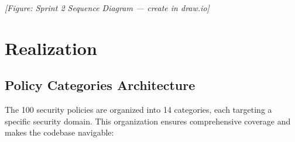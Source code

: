 
\textit{[Figure: Sprint 2 Sequence Diagram — create in draw.io]}

\section{Realization}

\subsection{Policy Categories Architecture}

The 100 security policies are organized into 14 categories, each targeting a specific security domain. This organization ensures comprehensive coverage and makes the codebase navigable:

